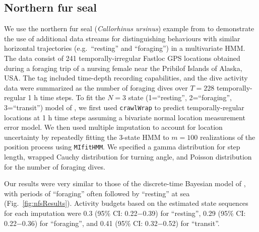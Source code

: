 \documentclass[12pt]{article}\usepackage[]{graphicx}\usepackage[]{color}
\begin{document}
\subsection{Northern fur seal}
\label{sec:nfs}
We use the northern fur seal ({\it Callorhinus ursinus}) example from \cite{McClintockEtAl2014b} to demonstrate the use of additional data streams for distinguishing behaviours with similar horizontal trajectories (e.g.\ ``resting'' and ``foraging'') in a multivariate HMM. The data consist of 241 temporally-irregular Fastloc GPS locations obtained during a foraging trip of a nursing female near the Pribilof Islands of Alaska, USA. The tag included time-depth recording capabilities, and the dive activity data were summarized as the number of foraging dives over $T=228$ temporally-regular 1 h time steps. To fit the $N=3$ state (1=``resting'', 2=``foraging'', 3=``transit'') model of \cite{McClintockEtAl2014b}, we first used \verb|crawlWrap| to predict temporally-regular locations at 1 h time steps assuming a bivariate normal location measurement error model. %
We then used multiple imputation to account for location uncertainty by repeatedly fitting the 3-state HMM to $m=100$ realizations of the position process using \verb|MIfitHMM|. We specified a gamma distribution for step length, wrapped Cauchy distribution for turning angle, and Poisson distribution for the number of foraging dives. %

Our results were very similar to those of the discrete-time Bayesian model of \cite{McClintockEtAl2014b}, with periods of ``foraging'' often followed by ``resting'' at sea (Fig.\ \ref{fig:nfsResults}).  Activity budgets based on the estimated state sequences for each imputation were 0.3 (95\% CI: 0.22$-$0.39) for ``resting'', 0.29 (95\% CI: 0.22$-$0.36) for ``foraging'', and 0.41 (95\% CI: 0.32$-$0.52) for ``transit''.
\end{document}
